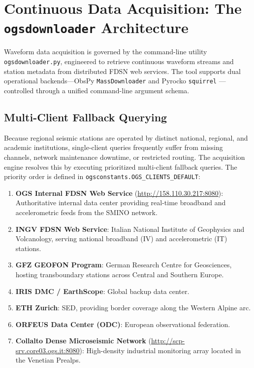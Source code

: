 \section{Continuous Data Acquisition: The \texttt{ogsdownloader} Architecture}
\label{sec:data_acquisition}

Waveform data acquisition is governed by the command-line utility
\texttt{ogsdownloader.py}, engineered to retrieve continuous
waveform streams and station metadata from distributed \acf{FDSN}
web services. The tool supports dual operational backends—ObsPy
\texttt{MassDownloader} \parencite{ObsPy} and Pyrocko
\texttt{squirrel} \parencite{Pyrocko}—controlled through a unified
command-line argument schema.

\subsection{Multi-Client Fallback Querying}
\label{subsec:multi_client_fallback}

Because regional seismic stations are operated by distinct national,
regional, and academic institutions, single-client queries
frequently suffer from missing channels, network maintenance
downtime, or restricted routing. The acquisition engine resolves
this by executing prioritized multi-client fallback queries. The
priority order is defined in \texttt{ogsconstants.OGS\_CLIENTS\_DEFAULT}:
\begin{enumerate}
  \item \textbf{\ac{OGS} Internal \ac{FDSN} Web Service}
    (\url{http://158.110.30.217:8080}): Authoritative internal data
    center providing real-time broadband and accelerometric feeds
    from the \ac{SMINO} network.
  \item \textbf{\ac{INGV} \ac{FDSN} Web Service}: Italian National Institute
    of Geophysics and Volcanology, serving national broadband (IV)
    and accelerometric (IT) stations.
  \item \textbf{GFZ GEOFON Program}: German Research Centre for
    Geosciences, hosting transboundary stations across Central and
    Southern Europe.
  \item \textbf{IRIS DMC / EarthScope}: Global backup data center.
  \item \textbf{ETH Zurich}: \acf{SED},
    providing border coverage along the Western Alpine arc.
  \item \textbf{\ac{ORFEUS} Data Center (ODC)}: European
    observational federation.
  \item \textbf{Collalto Dense Microseismic Network}
    (\url{http://scp-srv.core03.ogs.it:8080}): High-density
    industrial monitoring array located in the Venetian Prealps.
\end{enumerate}

